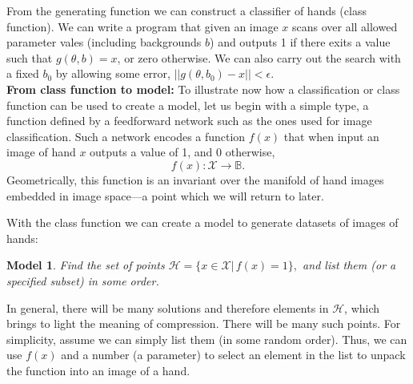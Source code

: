 \documentclass[11pt]{amsart}
\newcommand{\inputspace}{\mathcal X}
\newcommand{\handspace}{\mathcal H}
\newtheorem{model}{Model}
\begin{document}


From the generating function we can construct a classifier of hands (class function). We can write a program that given an image $x$ scans over all allowed parameter vales  (including backgrounds $b$) and outputs 1 if there exits a value such that $g(\theta,b)=x$, or zero otherwise. We can  also carry out the search with a fixed $b_{0}$ by allowing some error, $|| g(\theta, b_{0}) - x || < \epsilon$.\\

{\bf From class function to model:}  To illustrate now how a  classification or class function can be used to create  a model, let us begin with a simple type, a function defined by a feedforward network such as the ones used for image classification. Such a network encodes a function $f(x)$  that when input an image of hand $x$   outputs a value of 1, and 0 otherwise,
$$
f(x): \inputspace \longrightarrow \mathbb B.
$$ Geometrically,  this function is an invariant over the manifold of hand images embedded in image space---a point which we will return to later. 

With the  class function we can create a model to  generate datasets of images of hands:%

\begin{model}
{Find the set of points  $ \mathcal  H=\{ x \in \inputspace  | \, f(x)=1 \},$  and list them (or a specified subset) in some order}. \
 \end{model}
\noindent 
 In general, there will be many  solutions and therefore elements in $  \handspace$, which brings to light the meaning of compression. 
 There will be many such points. For simplicity, assume we can simply list them (in some random order).   Thus, we can use $f(x)$ and a number  (a parameter) to select an element in the list  to unpack the function into an image of a hand.\\
 
\end{document}
